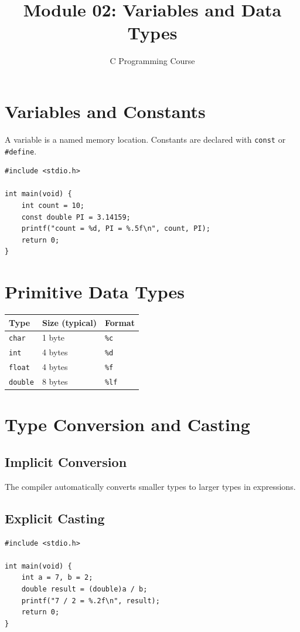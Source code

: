 \documentclass[11pt,a4paper]{article}
\title{Module 02: Variables and Data Types}
\author{C Programming Course}
\date{}
\begin{document}
\maketitle
\thispagestyle{fancy}

\section{Variables and Constants}
A variable is a named memory location. Constants are declared with \texttt{const}
or \texttt{\#define}.

\begin{lstlisting}
#include <stdio.h>

int main(void) {
    int count = 10;
    const double PI = 3.14159;
    printf("count = %d, PI = %.5f\n", count, PI);
    return 0;
}
\end{lstlisting}

\section{Primitive Data Types}
\begin{center}
\begin{tabular}{lll}
\hline
\textbf{Type} & \textbf{Size (typical)} & \textbf{Format} \\
\hline
\texttt{char}   & 1 byte  & \texttt{\%c} \\
\texttt{int}    & 4 bytes & \texttt{\%d} \\
\texttt{float}  & 4 bytes & \texttt{\%f} \\
\texttt{double} & 8 bytes & \texttt{\%lf} \\
\hline
\end{tabular}
\end{center}

\section{Type Conversion and Casting}
\subsection{Implicit Conversion}
The compiler automatically converts smaller types to larger types in expressions.

\subsection{Explicit Casting}
\begin{lstlisting}
#include <stdio.h>

int main(void) {
    int a = 7, b = 2;
    double result = (double)a / b;
    printf("7 / 2 = %.2f\n", result);
    return 0;
}
\end{lstlisting}
\end{document}

